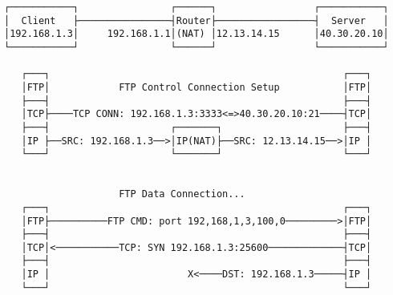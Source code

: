 \documentclass[varwidth=60em,crop]{standalone}
\begin{document}
\begin{verbatim}
┌───────────┐                ┌──────┐                 ┌───────────┐
│  Client   ├────────────────┤Router├─────────────────┤  Server   │
│192.168.1.3│     192.168.1.1│(NAT) │12.13.14.15      │40.30.20.10│
└───────────┘                └──────┘                 └───────────┘

   ┌───┐                                                   ┌───┐
   │FTP│            FTP Control Connection Setup           │FTP│
   ├───┤                                                   ├───┤
   │TCP├────TCP CONN: 192.168.1.3:3333<=>40.30.20.10:21────┤TCP│
   ├───┤                     ┌───────┐                     ├───┤
   │IP ├──SRC: 192.168.1.3──>│IP(NAT)├──SRC: 12.13.14.15──>│IP │
   └───┘                     └───────┘                     └───┘

                                                                   
                    FTP Data Connection...                       
   ┌───┐                                                   ┌───┐
   │FTP├──────────FTP CMD: port 192,168,1,3,100,0─────────>│FTP│
   ├───┤                                                   ├───┤
   │TCP│<───────────TCP: SYN 192.168.1.3:25600─────────────┤TCP│
   ├───┤                                                   ├───┤
   │IP │                        X<────DST: 192.168.1.3─────┤IP │
   └───┘                                                   └───┘
\end{verbatim}
\end{document}
